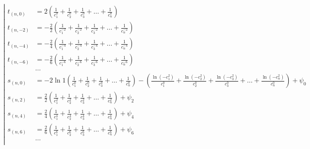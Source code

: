 \begin{equation*} \left| \begin{aligned}
t_{(n,0)} &=
  2
  \left(
  \frac{1}{c_1^0}
+ \frac{1}{c_2^0}
+ \frac{1}{c_3^0}
+ \ldots
+ \frac{1}{c_n^0}
  \right) \\
%
t_{(n,-2)} &=
- \frac{2}{2}
  \left(
  \frac{1}{c_1^{-2}}
+ \frac{1}{c_2^{-2}}
+ \frac{1}{c_3^{-2}}
+ \ldots
+ \frac{1}{c_n^{-2}}
  \right) \\
%
t_{(n,-4)} &=
- \frac{2}{4}
  \left(
  \frac{1}{c_1^{-4}}
+ \frac{1}{c_2^{-4}}
+ \frac{1}{c_3^{-4}}
+ \ldots
+ \frac{1}{c_n^{-4}}
  \right) \\
%
t_{(n,-6)} &=
- \frac{2}{6}
  \left(
  \frac{1}{c_1^{-6}}
+ \frac{1}{c_2^{-6}}
+ \frac{1}{c_3^{-6}}
+ \ldots
+ \frac{1}{c_n^{-6}}
  \right) \\
%
&\ldots \\
%
s_{(n,0)} &=
- 2 \ln{1}
  \left(
  \frac{1}{c_1^0}
+ \frac{1}{c_2^0}
+ \frac{1}{c_3^0}
+ \ldots
+ \frac{1}{c_n^0}
  \right)
- \left(
  \frac{\ln{(- c_1^2)}}{c_1^0}
+ \frac{\ln{(- c_2^2)}}{c_2^0}
+ \frac{\ln{(- c_3^2)}}{c_3^0}
+ \ldots
+ \frac{\ln{(- c_n^2)}}{c_n^0}
  \right)
+ \psi_0 \\
%
s_{(n,2)} &=
  \frac{2}{2}
  \left(
  \frac{1}{c_1^2}
+ \frac{1}{c_2^2}
+ \frac{1}{c_3^2}
+ \ldots
+ \frac{1}{c_n^2}
  \right)
+ \psi_2 \\
%
s_{(n,4)} &=
  \frac{2}{4}
  \left(
  \frac{1}{c_1^4}
+ \frac{1}{c_2^4}
+ \frac{1}{c_3^4}
+ \ldots
+ \frac{1}{c_n^4}
  \right)
+ \psi_4 \\
%
s_{(n,6)} &=
  \frac{2}{6}
  \left(
  \frac{1}{c_1^6}
+ \frac{1}{c_2^6}
+ \frac{1}{c_3^6}
+ \ldots
+ \frac{1}{c_n^6}
  \right)
+ \psi_6 \\
%
&\ldots \\
\end{aligned} \right. \end{equation*}